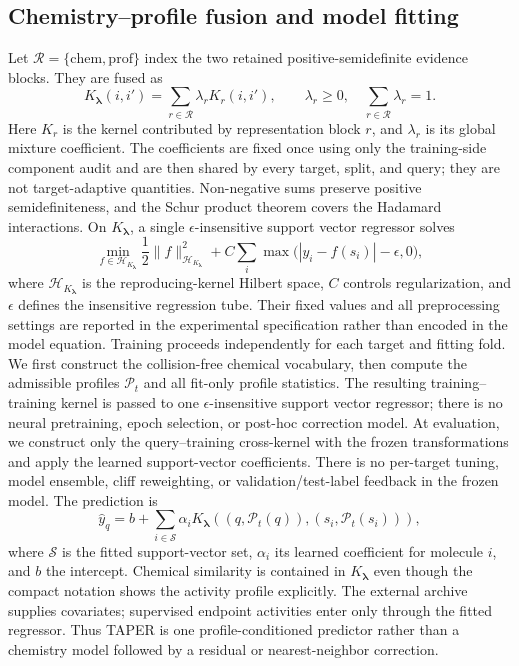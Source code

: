 \documentclass[manuscript,nonacm]{acmart}
\newcommand{\method}{TAPER\xspace}
\begin{document}
\subsection{Chemistry--profile fusion and model fitting}
Let $\mathcal{R}=\{\mathrm{chem},\mathrm{prof}\}$ index the two retained
positive-semidefinite evidence blocks. They are fused as
\begin{equation}
K_{\boldsymbol{\lambda}}(i,i')=
\sum_{r\in\mathcal{R}}\lambda_r K_r(i,i'),
\qquad \lambda_r\geq0,\quad \sum_{r\in\mathcal{R}}\lambda_r=1.
\end{equation}
Here $K_r$ is the kernel contributed by representation block $r$, and $\lambda_r$ is
its global mixture coefficient. The coefficients are fixed once using only the
training-side component audit and are then shared by every target, split, and query;
they are not target-adaptive quantities. Non-negative sums preserve positive
semidefiniteness, and the Schur product theorem covers the Hadamard
interactions. On $K_{\boldsymbol{\lambda}}$, a single
$\epsilon$-insensitive support vector regressor solves
\begin{equation}
\min_{f\in\mathcal{H}_{K_{\boldsymbol{\lambda}}}}\frac{1}{2}
\lVert f\rVert_{\mathcal{H}_{K_{\boldsymbol{\lambda}}}}^{2}
+C\sum_i\max\big(|y_i-f(s_i)|-\epsilon,0\big),
\end{equation}
where $\mathcal{H}_{K_{\boldsymbol{\lambda}}}$ is the reproducing-kernel Hilbert
space, $C$ controls regularization, and $\epsilon$ defines the insensitive
regression tube. Their fixed values and all preprocessing settings are reported
in the experimental specification rather than encoded in the model equation.
Training proceeds independently for each target and fitting fold. We first
construct the collision-free chemical vocabulary, then compute the admissible
profiles $\mathcal{P}_t$ and all fit-only profile statistics. The resulting
training--training kernel is passed to one $\epsilon$-insensitive support vector
regressor; there is no neural pretraining, epoch selection, or post-hoc
correction model. At evaluation, we construct only the query--training
cross-kernel with the frozen transformations and apply the learned support-vector
coefficients. There is no per-target tuning, model ensemble, cliff reweighting,
or validation/test-label feedback in the frozen model. The prediction is
\begin{equation}
\widehat y_q=b+\sum_{i\in\mathcal S}\alpha_i
K_{\boldsymbol{\lambda}}\!\left(
(q,\mathcal P_t(q)),(s_i,\mathcal P_t(s_i))\right),
\end{equation}
where $\mathcal S$ is the fitted support-vector set, $\alpha_i$ its learned
coefficient for molecule $i$, and $b$ the intercept. Chemical similarity is
contained in $K_{\boldsymbol{\lambda}}$ even though the compact notation shows
the activity profile explicitly. The external archive supplies covariates;
supervised endpoint activities enter only through the fitted regressor. Thus
\method is one profile-conditioned predictor rather than a chemistry model
followed by a residual or nearest-neighbor correction.
\end{document}
